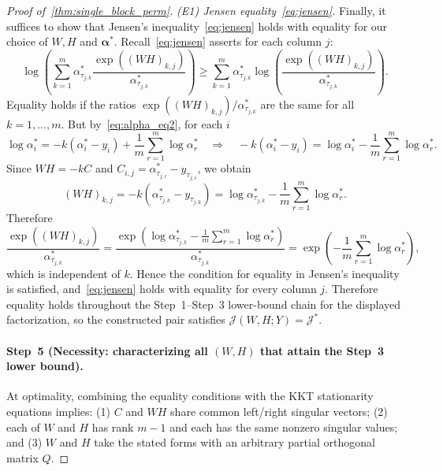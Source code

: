 \documentclass[11pt]{article}
\begin{document}
\begin{proof}[Proof of~\cref{thm:single_block_perm}]
\noindent\textit{(E1) Jensen equality~\cref{eq:jensen}.}  Finally, it suffices to show that Jensen's inequality~\cref{eq:jensen} holds with equality for our choice of $W,H$ and $\boldsymbol{\alpha}^*$. Recall~\cref{eq:jensen} asserts for each column $j$:
\[
      \log \left(\sum_{k=1}^m \alpha^*_{\tau_{j,k}}
      \frac{\exp\left((WH)_{k,j}\right)}{\alpha^*_{\tau_{j,k}}}\right)
      \ge \sum_{k=1}^m \alpha^*_{\tau_{j,k}}
      \log \left( \frac{\exp\left((WH)_{k,j}\right)}{\alpha^*_{\tau_{j,k}}}\right).
\]
Equality holds if the ratios \( \exp\left((WH)_{k,j}\right)/\alpha^*_{\tau_{j,k}} \) are the same for all $k=1,\dots,m$. But by~\cref{eq:alpha_eq2}, for each $i$
\[
\log\alpha^*_{i}
  = - k \left(\alpha^*_{i}-y_{i}\right)
    +\frac1m\sum_{r=1}^m\log\alpha^*_{r}
  \quad\Longrightarrow\quad
- k (\alpha^*_{i}-y_{i})
  = \log\alpha^*_{i}
    -\frac1m\sum_{r=1}^m\log\alpha^*_{r}.
\]
Since $WH=-k C$ and $C_{i,j}=\alpha^*_{\tau_{j,i}}-y_{\tau_{j,i}}$, we obtain
\[ (WH)_{k,j}
= - k\left(\alpha^*_{\tau_{j,k}}-y_{\tau_{j,k}}\right)
= \log\alpha^*_{\tau_{j,k}}
  -\frac1m\sum_{r=1}^m\log\alpha^*_{r}.
\]
Therefore
\[
\frac{\exp\left((WH)_{k,j}\right)}{\alpha^*_{\tau_{j,k}}}
= \frac{\exp \left(\log\alpha^*_{\tau_{j,k}}
                     -\frac1m\sum_{r=1}^m\log\alpha^*_{r}\right)}
       {\alpha^*_{\tau_{j,k}}}
= \exp\left(-\frac1m\sum_{r=1}^m\log\alpha^*_{r}\right),
\]
which is independent of $k$.  Hence the condition for equality in Jensen's
inequality is satisfied, and~\cref{eq:jensen} holds with equality for every
column $j$.  Therefore equality holds throughout the Step~1--Step~3 lower-bound
chain for the displayed factorization, so the constructed pair satisfies
\(\mathcal J(W,H;Y)=\mathcal J^*\).

\paragraph{Step~5 (Necessity: characterizing all $(W,H)$ that attain the Step~3 lower bound).}
At optimality, combining the equality conditions with the KKT stationarity equations implies: (1) $C$ and $WH$ share common left/right singular vectors; (2) each of $W$ and $H$ has rank $m-1$ and each has the same nonzero singular values; and (3) $W$ and $H$ take the stated forms with an arbitrary partial orthogonal matrix $Q$.


\end{proof}
\end{document}
